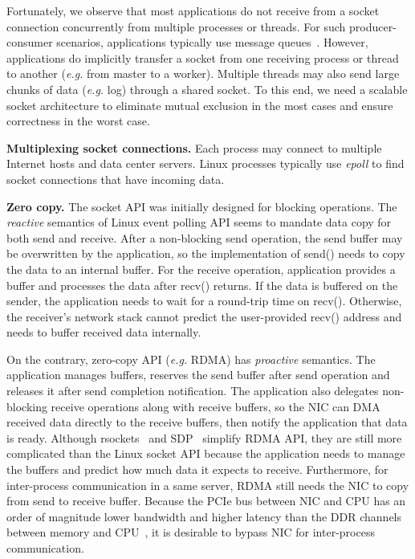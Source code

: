 Fortunately, we observe that most applications do not receive from a socket connection concurrently from multiple processes or threads. For such producer-consumer scenarios, applications typically use message queues~\cite{hintjens2013zeromq}. However, applications do implicitly transfer a socket from one receiving process or thread to another (\textit{e.g.} from master to a worker). Multiple threads may also send large chunks of data (\textit{e.g.} log) through a shared socket.
To this end, we need a scalable socket architecture to eliminate mutual exclusion in the most cases and ensure correctness in the worst case.


\textbf{Multiplexing socket connections.}
Each process may connect to multiple Internet hosts and data center servers. Linux processes typically use \textit{epoll} to find socket connections that have incoming data.


\textbf{Zero copy.}
The socket API was initially designed for blocking operations. The \textit{reactive} semantics of Linux event polling API seems to mandate data copy for both send and receive. After a non-blocking send operation, the send buffer may be overwritten by the application, so the implementation of send() needs to copy the data to an internal buffer. For the receive operation, application provides a buffer and processes the data after recv() returns. If the data is buffered on the sender, the application needs to wait for a round-trip time on recv(). Otherwise, the receiver's network stack cannot predict the user-provided recv() address and needs to buffer received data internally.

On the contrary, zero-copy API (\textit{e.g.} RDMA) has \textit{proactive} semantics. The application manages buffers, reserves the send buffer after send operation and releases it after send completion notification. The application also delegates non-blocking receive operations along with receive buffers, so the NIC can DMA received data directly to the receive buffers, then notify the application that data is ready. Although rsockets~\cite{rsockets} and SDP~\cite{socketsdirect} simplify RDMA API, they are still more complicated than the Linux socket API because the application needs to manage the buffers and predict how much data it expects to receive. Furthermore, for inter-process communication in a same server, RDMA still needs the NIC to copy from send to receive buffer. Because the PCIe bus between NIC and CPU has an order of magnitude lower bandwidth and higher latency than the DDR channels between memory and CPU~\cite{li2017kv}, it is desirable to bypass NIC for inter-process communication.
